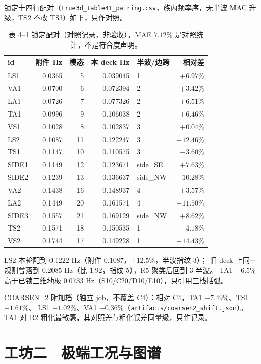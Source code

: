 \documentclass[11pt,a4paper]{ctexart}
\begin{document}
锁定十四行配对（\texttt{true3d\_table41\_pairing.csv}，族内频率序，无半波 MAC 升级，TS2 不改 TS3）如下，只作对照。

\begin{table}[h]\centering\footnotesize
\caption{表 4--1 锁定配对（对照记录，非验收）。MAE $7.12\%$ 是对照统计，不是符合度声明。}
\begin{tabular}{lrrrlr}
\toprule
id & 附件 Hz & 模态 & 本 deck Hz & 半波/边跨 & 相对差 \\
\midrule
LS1  & 0.0365 & 5  & 0.039045 & 1 & $+6.97\%$ \\
VA1  & 0.0700 & 6  & 0.072394 & 2 & $+3.42\%$ \\
LA1  & 0.0726 & 7  & 0.077326 & 2 & $+6.51\%$ \\
TA1  & 0.0996 & 9  & 0.106038 & 2 & $+6.46\%$ \\
VS1  & 0.1028 & 8  & 0.102837 & 3 & $+0.04\%$ \\
LS2  & 0.1087 & 11 & 0.122247 & 3 & $+12.46\%$ \\
TS1  & 0.1147 & 10 & 0.110575 & 3 & $-3.60\%$ \\
SIDE1& 0.1149 & 12 & 0.123671 & side\_SE & $+7.63\%$ \\
SIDE2& 0.1239 & 13 & 0.136637 & side\_NW & $+10.28\%$ \\
VA2  & 0.1438 & 16 & 0.148937 & 4 & $+3.57\%$ \\
LA2  & 0.1449 & 20 & 0.161571 & 4 & $+11.50\%$ \\
SIDE3& 0.1557 & 21 & 0.169129 & side\_NW & $+8.62\%$ \\
TS2  & 0.1571 & 18 & 0.150535 & 1 & $-4.18\%$ \\
VS2  & 0.1744 & 17 & 0.149228 & 1 & $-14.43\%$ \\
\bottomrule
\end{tabular}
\end{table}

LS2 本轮配到 $0.1222$ Hz（附件 $0.1087$，$+12.5\%$，半波指纹 3）；
旧 deck 上同一规则曾落到 $0.2085$ Hz（比 $1.92$，指纹 5），R5 聚类后回到 3 半波。
TA1 $+6.5\%$ 高于已锁三维地板 $0.0733$ Hz（S10/C20/D10/E10），只引用三栈括弧。

COARSEN=2 附加档（独立 job，不覆盖 C4）：相对 C4，TA1 $-7.49\%$、TS1 $-1.61\%$、
LS1 $-1.02\%$、VA1 $-0.36\%$（\texttt{artifacts/coarsen2\_shift.json}）。
TA1 对 R2 粗化最敏感，其对照差与粗化误差同量级，只作记录。

\section{工坊二　极端工况与图谱}
\end{document}
